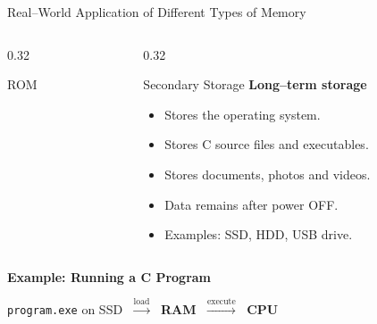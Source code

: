\documentclass[aspectratio=169]{beamer}
\begin{document}
\begin{frame}{Real--World Application of Different Types of Memory}
\begin{columns}[T]
\begin{column}{0.32\textwidth}
\begin{block}{ROM}
				\end{block}
				
			\end{column}
			
			\begin{column}{0.32\textwidth}
				
				\begin{block}{Secondary Storage}
					\centering
					\textbf{Long--term storage}
					
					\vspace{0.2cm}
					
					\begin{itemize}\small
						\item Stores the operating system.
						\item Stores C source files and executables.
						\item Stores documents, photos and videos.
						\item Data remains after power OFF.
						\item Examples: SSD, HDD, USB drive.
					\end{itemize}
					
				\end{block}
				
			\end{column}
			
		\end{columns}
		
		\vspace{0.35cm}
		
		\begin{center}
			\large
			\textbf{Example: Running a C Program}
		\end{center}
		
		\begin{center}
			\small
			\texttt{program.exe} on SSD
			$\;\xrightarrow{\text{load}}\;$
			\textbf{RAM}
			$\;\xrightarrow{\text{execute}}\;$
			\textbf{CPU}
		\end{center}
		
	\end{frame}
	
\end{document}
